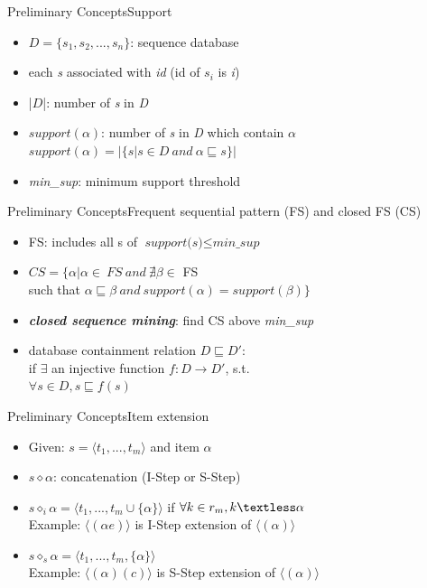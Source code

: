 \documentclass[12pt]{beamer}
\begin{document}
\begin{frame}{Preliminary Concepts}{Support}
\begin{itemize}
\item $\textit{D} = \{ s_1,s_2,...,s_n \}$: sequence database
\item each \textit{s} associated with \textit{id} (id of $s_i$ is \textit{i})
\item |$\textit{D}$|: number of \textit{s} in \textit{D}
\item $support(\alpha)$: number of \textit{s} in \textit{D} which contain $\alpha$\\
$support(\alpha) = |\{ s|s \in D~and~\alpha \sqsubseteq s\}|$
\item \textit{min\_sup}: minimum support threshold
\end{itemize}
\end{frame}

\begin{frame}{Preliminary Concepts}{Frequent sequential pattern (FS) and closed FS (CS)}
\begin{itemize}
\item FS: includes all s of $\textit{support(s)} \leq \textit{min\_sup}$
\item $CS = \{ \alpha|\alpha \in~FS~and~\nexists\beta \in$ FS\\such that $\alpha \sqsubseteq \beta~and~support(\alpha) = support(\beta)\}$
\item {\bf {\it closed sequence mining}}: find CS above {\it min\_sup}
\item database containment relation $D \sqsubseteq D'$:\\if $\exists$ an injective function $f : D \rightarrow D'$, s.t.\\
$\forall s \in D, s \sqsubseteq f(s)$
\end{itemize}
\end{frame}

\begin{frame}{Preliminary Concepts}{Item extension}
\begin{itemize}
\item Given: $s = \langle t_1,...,t_m \rangle$ and item $\alpha$
\item $s \diamond \alpha$: concatenation (I-Step or S-Step)
\item $s \diamond_i \alpha = \langle t_1,...,t_m \cup \{ \alpha \} \rangle$ if $\forall k \in r_m, k \textless \alpha$\\ Example: $\langle (\alpha e) \rangle$ is I-Step extension of $\langle (\alpha) \rangle$
\item $s \diamond_s \alpha = \langle t_1,...,t_m,\{ \alpha \} \rangle$\\ Example: $\langle (\alpha)(c) \rangle$ is S-Step extension of $\langle (\alpha) \rangle$
\end{itemize}
\end{frame}
\end{document}
